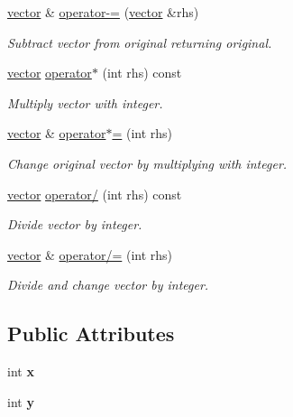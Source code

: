 \begin{DoxyCompactItemize}
\hyperlink{classvector}{vector} \& \hyperlink{classvector_a8817a31fd651ccab5601ec6c98839a56}{operator-\/=} (\hyperlink{classvector}{vector} \&rhs)
\begin{DoxyCompactList}\small\item\em Subtract vector from original returning original. \end{DoxyCompactList}\item 
\hyperlink{classvector}{vector} \hyperlink{classvector_af5eb8137df41617181487e49d85df888}{operator$\ast$} (int rhs) const 
\begin{DoxyCompactList}\small\item\em Multiply vector with integer. \end{DoxyCompactList}\item 
\hyperlink{classvector}{vector} \& \hyperlink{classvector_a810bc94e83cfd9eb092f7f39fcc77487}{operator$\ast$=} (int rhs)
\begin{DoxyCompactList}\small\item\em Change original vector by multiplying with integer. \end{DoxyCompactList}\item 
\hyperlink{classvector}{vector} \hyperlink{classvector_a94f6a7eeb016bbb4b296eeafb507679c}{operator/} (int rhs) const 
\begin{DoxyCompactList}\small\item\em Divide vector by integer. \end{DoxyCompactList}\item 
\hyperlink{classvector}{vector} \& \hyperlink{classvector_a87765b60e94a08763ff2db6fe56125e9}{operator/=} (int rhs)
\begin{DoxyCompactList}\small\item\em Divide and change vector by integer. \end{DoxyCompactList}\end{DoxyCompactItemize}
\subsection*{Public Attributes}
\begin{DoxyCompactItemize}
\item 
int {\bfseries x}\hypertarget{classvector_a0403eb3aea23a3009e276fba1d317046}{}\label{classvector_a0403eb3aea23a3009e276fba1d317046}

\item 
int {\bfseries y}\hypertarget{classvector_aad6de640298eae97ca0a094db5aff477}{}\label{classvector_aad6de640298eae97ca0a094db5aff477}

\end{DoxyCompactItemize}
